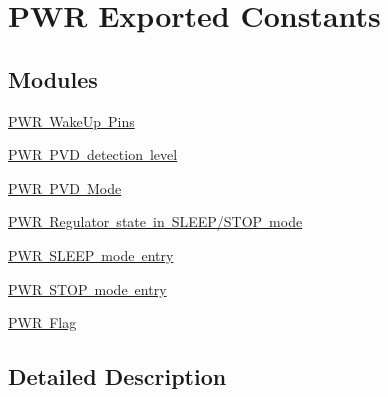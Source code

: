 \hypertarget{group___p_w_r___exported___constants}{}\section{P\+WR Exported Constants}
\label{group___p_w_r___exported___constants}
\subsection*{Modules}
\begin{DoxyCompactItemize}
\item 
\mbox{\hyperlink{group___p_w_r___wake_up___pins}{P\+W\+R Wake\+Up Pins}}
\item 
\mbox{\hyperlink{group___p_w_r___p_v_d__detection__level}{P\+W\+R P\+V\+D detection level}}
\item 
\mbox{\hyperlink{group___p_w_r___p_v_d___mode}{P\+W\+R P\+V\+D Mode}}
\item 
\mbox{\hyperlink{group___p_w_r___regulator__state__in___s_t_o_p__mode}{P\+W\+R Regulator state in S\+L\+E\+E\+P/\+S\+T\+O\+P mode}}
\item 
\mbox{\hyperlink{group___p_w_r___s_l_e_e_p__mode__entry}{P\+W\+R S\+L\+E\+E\+P mode entry}}
\item 
\mbox{\hyperlink{group___p_w_r___s_t_o_p__mode__entry}{P\+W\+R S\+T\+O\+P mode entry}}
\item 
\mbox{\hyperlink{group___p_w_r___flag}{P\+W\+R Flag}}
\end{DoxyCompactItemize}


\subsection{Detailed Description}
